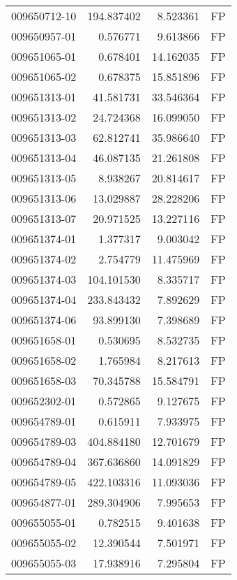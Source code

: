 \begin{tabular}{lrrl}
009650712-10 &  194.837402 &       8.523361 &   FP \\
009650957-01 &    0.576771 &       9.613866 &   FP \\
009651065-01 &    0.678401 &      14.162035 &   FP \\
009651065-02 &    0.678375 &      15.851896 &   FP \\
009651313-01 &   41.581731 &      33.546364 &   FP \\
009651313-02 &   24.724368 &      16.099050 &   FP \\
009651313-03 &   62.812741 &      35.986640 &   FP \\
009651313-04 &   46.087135 &      21.261808 &   FP \\
009651313-05 &    8.938267 &      20.814617 &   FP \\
009651313-06 &   13.029887 &      28.228206 &   FP \\
009651313-07 &   20.971525 &      13.227116 &   FP \\
009651374-01 &    1.377317 &       9.003042 &   FP \\
009651374-02 &    2.754779 &      11.475969 &   FP \\
009651374-03 &  104.101530 &       8.335717 &   FP \\
009651374-04 &  233.843432 &       7.892629 &   FP \\
009651374-06 &   93.899130 &       7.398689 &   FP \\
009651658-01 &    0.530695 &       8.532735 &   FP \\
009651658-02 &    1.765984 &       8.217613 &   FP \\
009651658-03 &   70.345788 &      15.584791 &   FP \\
009652302-01 &    0.572865 &       9.127675 &   FP \\
009654789-01 &    0.615911 &       7.933975 &   FP \\
009654789-03 &  404.884180 &      12.701679 &   FP \\
009654789-04 &  367.636860 &      14.091829 &   FP \\
009654789-05 &  422.103316 &      11.093036 &   FP \\
009654877-01 &  289.304906 &       7.995653 &   FP \\
009655055-01 &    0.782515 &       9.401638 &   FP \\
009655055-02 &   12.390544 &       7.501971 &   FP \\
009655055-03 &   17.938916 &       7.295804 &   FP \\

\end{tabular}
